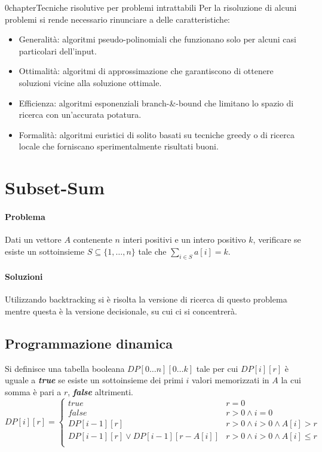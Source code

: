 0chapter{Tecniche risolutive per problemi intrattabili}
Per la risoluzione di alcuni problemi si rende necessario rinunciare a delle caratteristiche:
\begin{itemize}
	\item Generalit\`a: algoritmi pseudo-polinomiali che funzionano solo per alcuni casi particolari dell'input.
	\item Ottimalit\`a: algoritmi di approssimazione che garantiscono di ottenere soluzioni vicine alla soluzione ottimale.
	\item Efficienza: algoritmi esponenziali branch-\&-bound che limitano lo spazio di ricerca con un'accurata potatura.
	\item Formalit\`a: algoritmi euristici di solito basati su tecniche greedy o di ricerca locale che forniscano sperimentalmente risultati buoni.
\end{itemize}
\section{Subset-Sum}
\paragraph{Problema}
Dati un vettore $A$ contenente $n$ interi positivi e un intero positivo $k$, verificare se esiste un sottoinsieme $S\subseteq\{1, \dots, n\}$ tale che $\sum\limits_{i\in S}a[i] = k$.
\paragraph{Soluzioni}
Utilizzando backtracking si \`e risolta la versione di ricerca di questo problema mentre questa \`e la versione decisionale, su cui ci si concentrer\`a. 
\subsection{Programmazione dinamica}
Si definisce una tabella booleana $DP[0\dots n][0\dots k]$ tale per cui $DP[i][r]$ \`e uguale a \emph{\textbf{true}} se esiste un sottoinsieme dei primi $i$ valori memorizzati in $A$
la cui somma \`e pari a $r$, \emph{\textbf{false}} altrimenti.
$$DP[i][r] = 
\begin{cases}
	true \quad\quad\quad & r = 0\\
	false & r > 0 \land i = 0\\
	DP[i - 1][r] & r > 0 \land i > 0 \land A[i] > r\\
	DP[i - 1][r] \lor DP[i - 1][r - A[i]] & r > 0 \land i > 0 \land A[i]\le r\\
\end{cases}$$

